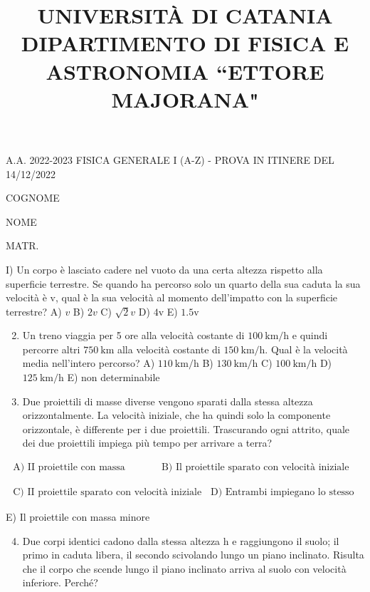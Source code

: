 \documentclass[10pt]{article}
\title{UNIVERSITÀ DI CATANIA 
 DIPARTIMENTO DI FISICA E ASTRONOMIA “ETTORE MAJORANA" }
\author{}
\date{}
\begin{document}
\maketitle
A.A. 2022-2023 FISICA GENERALE I (A-Z) - PROVA IN ITINERE DEL 14/12/2022

COGNOME

NOME

MATR.

I) Un corpo è lasciato cadere nel vuoto da una certa altezza rispetto alla superficie terrestre. Se quando ha percorso solo un quarto della sua caduta la sua velocità è v, qual è la sua velocità al momento dell'impatto con la superficie terrestre?
A) \(v\)
B) \(2 v\)
C) \(\sqrt{2} v\)
D) \(4 \mathrm{v}\)
E) \(1.5 \mathrm{v}\)

\begin{enumerate}
  \setcounter{enumi}{1}
  \item Un treno viaggia per 5 ore alla velocità costante di \(100 \mathrm{~km} / \mathrm{h}\) e quindi percorre altri \(750 \mathrm{~km}\) alla velocità costante di \(150 \mathrm{~km} / \mathrm{h}\). Qual è la velocità media nell'intero percorso?
A) \(110 \mathrm{~km} / \mathrm{h}\)
B) \(130 \mathrm{~km} / \mathrm{h}\)
C) \(100 \mathrm{~km} / \mathrm{h}\)
D) \(125 \mathrm{~km} / \mathrm{h}\)
E) non determinabile

  \item Due proiettili di masse diverse vengono sparati dalla stessa altezza orizzontalmente. La velocità iniziale, che ha quindi solo la componente orizzontale, è differente per i due proiettili. Trascurando ogni attrito, quale dei due proiettili impiega più tempo per arrivare a terra?

\end{enumerate}

\(\begin{array}{ll}\text { A) II proiettile con massa maggiore } & \text { B) Il proiettile sparato con velocità iniziale maggiore }\end{array}\)

\(\begin{array}{lll}\text { C) II proiettile sparato con velocità iniziale minore } & \text { D) Entrambi impiegano lo stesso tempo }\end{array}\)

E) Il proiettile con massa minore

\begin{enumerate}
  \setcounter{enumi}{3}
  \item Due corpi identici cadono dalla stessa altezza \(\mathrm{h}\) e raggiungono il suolo; il primo in caduta libera, il secondo scivolando lungo un piano inclinato. Risulta che il corpo che scende lungo il piano inclinato arriva al suolo con velocità inferiore. Perché?
\end{enumerate}
\end{document}
